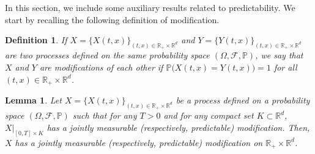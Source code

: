 \documentclass[letterpaper, 11pt,  reqno]{amsart}
\newtheorem{lemma}[theorem]{Lemma}
\newtheorem{definition}[theorem]{Definition}
\newcommand{\R}{\mathbb{R}}
\newcommand{\bP}{\mathbb{P}}
\newcommand{\bv}{\big\vert}
\newcommand{\F}{\mathcal{F}}
\renewcommand{\O}{\Omega}
\numberwithin{equation}{section}
\numberwithin{theorem}{section}
\begin{document}
In this section, we include some auxiliary  results related to predictability.
 We start by recalling the following definition of modification.


\begin{definition}

If $X=\{X(t,x)\}_{(t,x)\in \R_{+} \times \R^d}$ and $Y=\{Y(t,x)\}_{(t,x)\in \R_{+} \times \R^d}$
 are two processes defined on the same probability space $(\O, \F,\bP)$, 
 we say that $X$ and $Y$ are   modifications of each other if
$\bP\big(X(t,x)=Y(t,x)\big)=1$ 
for     all $(t,x) \in \R_{+} \times \R^d$.
 \end{definition}


\begin{lemma}
\label{pred-all}
Let  $X=\{X(t,x)\}_{(t,x)\in \R_{+} \times \R^d}$ be a  process 
defined on a probability space $(\O,\F,\bP)$ such that 
 for any $T>0$ and for any compact set $K \subset \R^d$, $X\bv_{[0,T]\times K}$ 
 has a jointly measurable {\rm(}respectively, predictable{\rm)} modification.
 Then, $X$ has a jointly measurable 
 {\rm(}respectively, predictable{\rm)} modification on $\R_{+}\times \R^d$.
\end{lemma}
\end{document}
